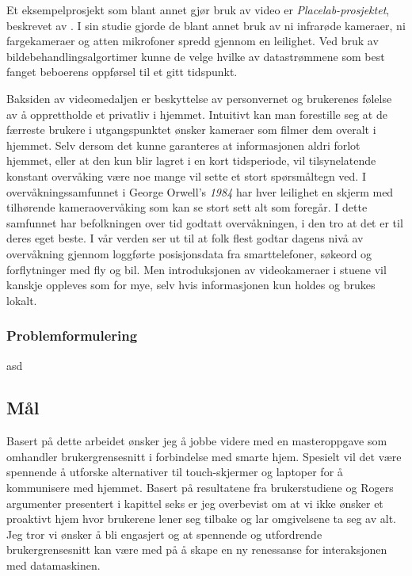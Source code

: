 {Et eksempelprosjekt som blant annet gjør bruk av video er \emph{Placelab-prosjektet}, beskrevet av \citet{placelab05}. I sin studie gjorde de blant annet bruk av ni infrarøde kameraer, ni fargekameraer og atten mikrofoner spredd gjennom en leilighet. Ved bruk av bildebehandlingsalgortimer kunne de velge hvilke av datastrømmene som best fanget beboerens oppførsel til et gitt tidspunkt.

Baksiden av videomedaljen er beskyttelse av personvernet og brukerenes følelse av å opprettholde et privatliv i hjemmet. Intuitivt kan man forestille seg at de færreste brukere i utgangspunktet ønsker kameraer som filmer dem overalt i hjemmet. Selv dersom det kunne garanteres at informasjonen aldri forlot hjemmet, eller at den kun blir lagret i en kort tidsperiode, vil tilsynelatende konstant overvåking være noe mange vil sette et stort spørsmåltegn ved. I overvåkningssamfunnet i George Orwell's \emph{1984} har hver leilighet en skjerm med tilhørende kameraovervåking som kan se stort sett alt som foregår. I dette samfunnet har befolkningen over tid godtatt overvåkningen, i den tro at det er til deres eget beste. I vår verden ser ut til at folk flest godtar dagens nivå av overvåkning gjennom loggførte posisjonsdata fra smarttelefoner, søkeord og forflytninger med fly og bil. Men introduksjonen av videokameraer i stuene vil kanskje oppleves som for mye, selv hvis informasjonen kun holdes og brukes lokalt.

\subsubsection*{Problemformulering}
asd

\subsection{Mål}
Basert på dette arbeidet ønsker jeg å jobbe videre med en masteroppgave som omhandler brukergrensesnitt i forbindelse med smarte hjem. Spesielt vil det være spennende å utforske alternativer til touch-skjermer og laptoper for å kommunisere med hjemmet. Basert på resultatene fra brukerstudiene og Rogers argumenter presentert i kapittel seks er jeg overbevist om at vi ikke ønsker et proaktivt hjem hvor brukerene lener seg tilbake og lar omgivelsene ta seg av alt. Jeg tror vi ønsker å bli engasjert og at spennende og utfordrende brukergrensesnitt kan være med på å skape en ny renessanse for interaksjonen med datamaskinen.

}
